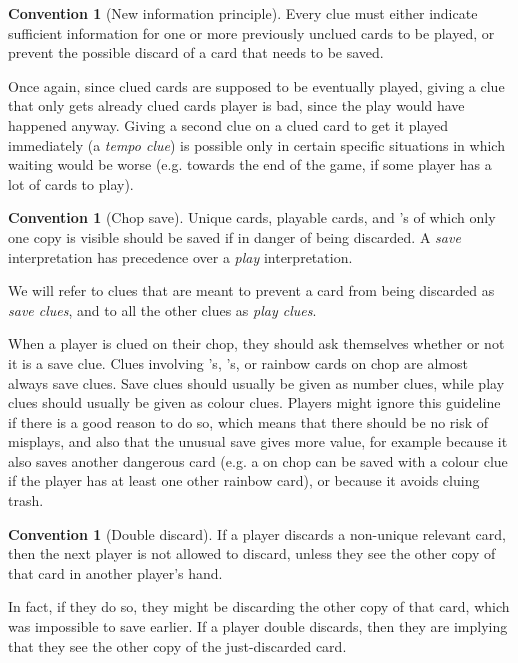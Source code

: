 \documentclass[a4paper]{article}
\theoremstyle{plain}
\theoremstyle{definition}
\newtheorem{convention}[theorem]{Convention}
\begin{document}
\begin{convention}[New information principle]
	\label{new-information}
	Every clue must either indicate sufficient information for one or more previously unclued cards to be played, or prevent the possible discard of a card that needs to be saved.
\end{convention}

Once again, since clued cards are supposed to be eventually played, giving a clue that only gets already clued cards player is bad, since the play would have happened anyway. Giving a second clue on a clued card to get it played immediately (a \textit{tempo clue}) is possible only in certain specific situations in which waiting would be worse (e.g. towards the end of the game, if some player has a lot of cards to play).

\begin{convention}[Chop save]
	Unique cards, playable cards, and 's of which only one copy is visible should be saved if in danger of being discarded. A \textit{save} interpretation has precedence over a \textit{play} interpretation.
\end{convention}

We will refer to clues that are meant to prevent a card from being discarded as \textit{save clues}, and to all the other clues as \textit{play clues}.

When a player is clued on their chop, they should ask themselves whether or not it is a save clue. Clues involving 's, 's, or rainbow cards on chop are almost always save clues. Save clues should usually be given as number clues, while play clues should usually be given as colour clues. Players might ignore this guideline if there is a good reason to do so, which means that there should be no risk of misplays, and also that the unusual save gives more value, for example because it also saves another dangerous card (e.g. a  on chop can be saved with a colour clue if the player has at least one other rainbow card), or because it avoids cluing trash.

\begin{convention}[Double discard]
	If a player discards a non-unique relevant card, then the next player is not allowed to discard, unless they see the other copy of that card in another player's hand.
\end{convention}

In fact, if they do so, they might be discarding the other copy of that card, which was impossible to save earlier. If a player double discards, then they are implying that they see the other copy of the just-discarded card.
\end{document}
